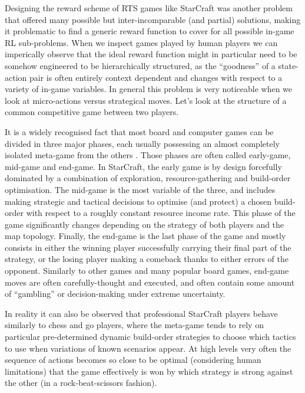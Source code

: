 Designing the reward scheme of RTS games like StarCraft was another problem that
offered many possible but inter-incomparable (and partial) solutions, making it
problematic to find a generic reward function to cover for all possible in-game
RL sub-problems. When we inspect games played by human players we can
imperically observe that the ideal reward function might in particular need to
be somehow engineered to be hierarchically structured, as the ``goodness'' of a
state-action pair is often entirely context dependent and changes with respect
to a variety of in-game variables. In general this problem is very noticeable
when we look at micro-actions versus strategical moves. Let's look at the
structure of a common competitive game between two players.

It is a widely recognised fact that most board and computer games can be divided
in three major phases, each usually possessing an almost completely isolated
meta-game from the others \citep{liquipediastrat}. Those phases are often called
early-game, mid-game and end-game. In StarCraft, the early game is by design
forcefully dominated by a combination of exploration, resource-gathering and
build-order optimisation. The mid-game is the most variable of the three, and
includes making strategic and tactical decisions to optimise (and protect) a
chosen build-order with respect to a roughly constant resource income rate. This
phase of the game significantly changes depending on the strategy of both
players and the map topology. Finally, the end-game is the last phase of the
game and mostly consists in either the winning player successfully carrying
their final part of the strategy, or the losing player making a comeback thanks
to either errors of the opponent. Similarly to other games and many popular
board games, end-game moves are often carefully-thought and executed, and often
contain some amount of ``gambling'' or decision-making under extreme
uncertainty.

In reality it can also be observed that professional StarCraft players behave
similarly to chess and go players, where the meta-game tends to rely on
particular pre-determined dynamic build-order strategies to choose which tactics
to use when variations of known scenarios appear. At high levels very often the
sequence of actions becomes so close to be optimal (considering human
limitations) that the game effectively is won by which strategy is strong
against the other (in a rock-beat-scissors fashion).

